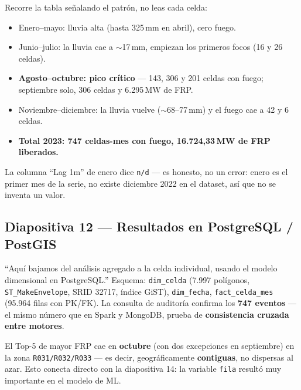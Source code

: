 \documentclass[11pt,a4paper]{article}
\begin{document}
\begin{decirbox}
Recorre la tabla se\~nalando el patr\'on, no leas cada celda:
\begin{itemize}
    \item Enero--mayo: lluvia alta (hasta 325\,mm en abril), cero fuego.
    \item Junio--julio: la lluvia cae a $\sim$17\,mm, empiezan los primeros focos (16 y 26 celdas).
    \item \textbf{Agosto--octubre: pico cr\'itico} --- 143, 306 y 201 celdas con fuego; septiembre solo, 306 celdas y 6.295\,MW de FRP.
    \item Noviembre--diciembre: la lluvia vuelve ($\sim$68--77\,mm) y el fuego cae a 42 y 6 celdas.
    \item \textbf{Total 2023: 747 celdas-mes con fuego, 16.724,33\,MW de FRP liberados.}
\end{itemize}
\end{decirbox}

\begin{datobox}
La columna ``Lag 1m'' de enero dice \texttt{n/d} --- es honesto, no un error: enero es el primer mes de la serie, no existe diciembre 2022 en el dataset, as\'i que no se inventa un valor.
\end{datobox}

\subsection{Diapositiva 12 --- Resultados en PostgreSQL / PostGIS}

\begin{decirbox}
``Aqu\'i bajamos del an\'alisis agregado a la celda individual, usando el modelo dimensional en PostgreSQL.'' Esquema: \texttt{dim\_celda} (7.997 pol\'igonos, \texttt{ST\_MakeEnvelope}, SRID 32717, \'indice GiST), \texttt{dim\_fecha}, \texttt{fact\_celda\_mes} (95.964 filas con PK/FK). La consulta de auditor\'ia confirma los \textbf{747 eventos} --- el mismo n\'umero que en Spark y MongoDB, prueba de \textbf{consistencia cruzada entre motores}.
\end{decirbox}

\begin{datobox}
El Top-5 de mayor FRP cae en \textbf{octubre} (con dos excepciones en septiembre) en la zona \texttt{R031/R032/R033} --- es decir, geogr\'aficamente \textbf{contiguas}, no dispersas al azar. Esto conecta directo con la diapositiva 14: la variable \texttt{fila} result\'o muy importante en el modelo de ML.
\end{datobox}
\end{document}
